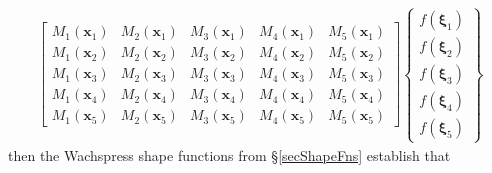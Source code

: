 \begin{subequations}
\begin{align}
\begin{bmatrix}
    M_1 (\boldsymbol{x}_1) & M_2 (\boldsymbol{x}_1) & 
    M_3 (\boldsymbol{x}_1) & M_4 (\boldsymbol{x}_1) & 
    M_5 (\boldsymbol{x}_1) \\
    M_1 (\boldsymbol{x}_2) & M_2 (\boldsymbol{x}_2) &
    M_3 (\boldsymbol{x}_2) & M_4 (\boldsymbol{x}_2) & 
    M_5 (\boldsymbol{x}_2) \\
    M_1 (\boldsymbol{x}_3) & M_2 (\boldsymbol{x}_3) & 
    M_3 (\boldsymbol{x}_3) & M_4 (\boldsymbol{x}_3) & 
    M_5 (\boldsymbol{x}_3) \\
    M_1 (\boldsymbol{x}_4) & M_2 (\boldsymbol{x}_4) & 
    M_3 (\boldsymbol{x}_4) & M_4 (\boldsymbol{x}_4) & 
    M_5 (\boldsymbol{x}_4) \\
    M_1 (\boldsymbol{x}_5) & M_2 (\boldsymbol{x}_5) & 
    M_3 (\boldsymbol{x}_5) & M_4 (\boldsymbol{x}_5) & 
    M_5 (\boldsymbol{x}_5) 
    \end{bmatrix} \left\{ \begin{matrix}
    f ( \boldsymbol{\xi}_1 ) \\ 
    f ( \boldsymbol{\xi}_2 ) \\ 
    f ( \boldsymbol{\xi}_3 ) \\ 
    f ( \boldsymbol{\xi}_4 ) \\ 
    f ( \boldsymbol{\xi}_5 )
    \end{matrix} \right\} 
    \end{align}
\end{subequations}
then the Wachspress shape functions from \S\ref{secShapeFns} establish that
